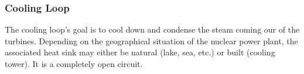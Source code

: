%
%
%
%
%
%


\subsubsection{Cooling Loop}


The cooling loop's goal is to cool down and condense the steam coming our of the turbines. Depending on the geographical situation of the nuclear power plant, the associated heat sink may either be natural (lake, sea, etc.) or built (cooling tower). It is a completely open circuit.

%
%
%
%
%
%


